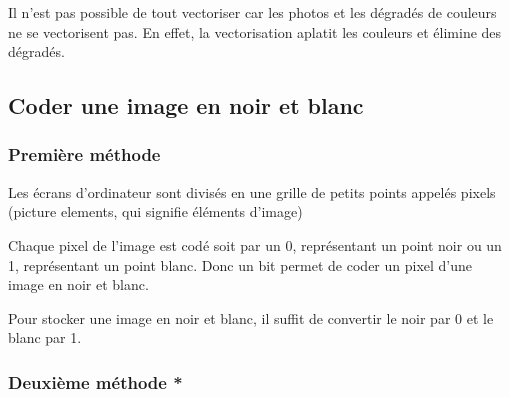 \documentclass[11pt, a4paper]{book}
\begin{document}
\begin{remarque}

Il n’est pas possible de tout vectoriser car les photos et les dégradés de couleurs ne se vectorisent pas. En effet, la vectorisation aplatit les couleurs et élimine des dégradés.

\end{remarque}

\subsection{Coder une image en noir et blanc}

\subsubsection{Première méthode}

\begin{defi}
Les écrans d’ordinateur sont divisés en une grille de petits points appelés pixels (picture elements, qui signifie éléments d’image)
\end{defi}

Chaque pixel de l'image est codé soit par un 0, représentant un point noir ou un 1, représentant un point blanc. Donc un bit permet de coder un pixel d’une image en noir et blanc. 

Pour stocker une image en noir et blanc, il suffit de convertir le noir par 0 et le blanc par 1. 

\begin{center}
\end{center}

\subsubsection{Deuxième méthode *}
\end{document}
